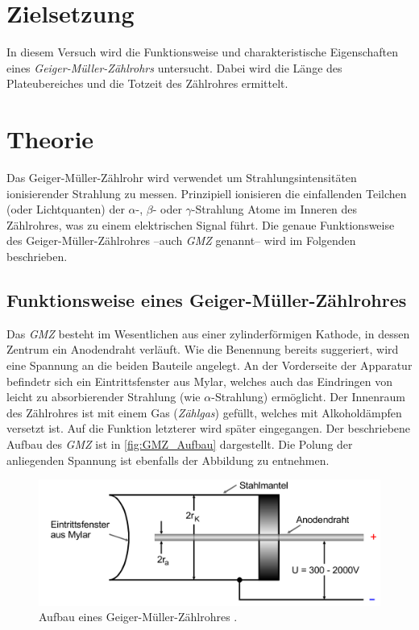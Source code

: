\section{Zielsetzung}
\label{sec:Ziel}
In diesem Versuch wird die Funktionsweise und charakteristische Eigenschaften eines \textit{Geiger-Müller-Zählrohrs} untersucht. Dabei wird die Länge des Plateubereiches
und die Totzeit des Zählrohres ermittelt.

\section{Theorie}
\label{sec:Theorie}
Das Geiger-Müller-Zählrohr wird verwendet um Strahlungsintensitäten ionisierender Strahlung zu messen. Prinzipiell ionisieren die einfallenden Teilchen (oder Lichtquanten) der 
$\alpha$-, $\beta$- oder $\gamma$-Strahlung Atome im Inneren des Zählrohres, was zu einem elektrischen Signal führt. Die genaue Funktionsweise des Geiger-Müller-Zählrohres
--auch \textit{GMZ} genannt-- wird im Folgenden beschrieben.

\subsection{Funktionsweise eines Geiger-Müller-Zählrohres}
\label{subsec:Funktion_GMZ}
Das \textit{GMZ} besteht im Wesentlichen aus einer zylinderförmigen Kathode, in dessen Zentrum ein Anodendraht verläuft. Wie die Benennung bereits suggeriert, wird eine Spannung 
an die beiden Bauteile angelegt. An der Vorderseite der Apparatur befindetr sich ein Eintrittsfenster aus Mylar, welches auch das Eindringen von leicht zu absorbierender
Strahlung (wie $\alpha$-Strahlung) ermöglicht. Der Innenraum des Zählrohres ist mit einem Gas (\textit{Zählgas}) gefüllt, welches mit Alkoholdämpfen versetzt ist. Auf die Funktion
letzterer wird später eingegangen.
Der beschriebene Aufbau des \textit{GMZ} ist in \autoref{fig:GMZ_Aufbau} dargestellt. Die Polung der anliegenden Spannung ist ebenfalls der Abbildung zu entnehmen.

\begin{figure}
    \centering
    \includegraphics[width = .8\textwidth]{content/GMZ_Aufbau.png}
    \caption{Aufbau eines Geiger-Müller-Zählrohres \cite{v703}.}
    \label{fig:GMZ_Aufbau}
  \end{figure}

